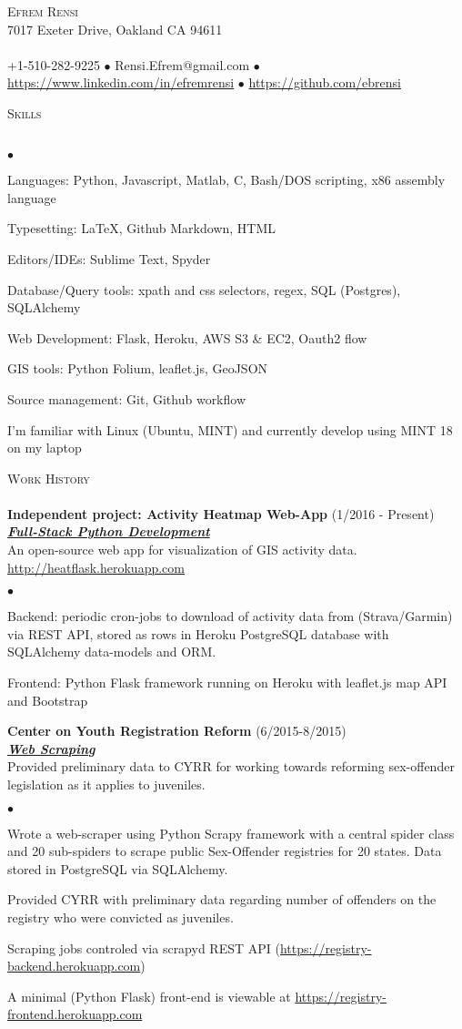 \documentclass{article}
\newcommand{\lineunder}{\vspace*{-8pt} \\ \hspace*{-18pt} \hrulefill \\}
\newcommand{\header}[1]{{\hspace*{-15pt}\vspace*{6pt} \textsc{#1}} \vspace*{-6pt} \lineunder}
\newcommand{\employer}[3]{{ \textbf{#1} (#2)\\ \underline{\textbf{\emph{#3}}}\\  }}
\newcommand{\contact}[3]{
\vspace*{-8pt}
\begin{center}
{\LARGE \scshape {#1}}\\
#2 \lineunder
#3
\end{center}
\vspace*{-8pt}
}
\newenvironment{achievements}{\begin{list}{$\bullet$}{\topsep 0pt \itemsep -2pt}}{\vspace*{4pt}\end{list}}
\begin{document}
\small
\smallskip
\vspace*{-44pt}

\contact{Efrem Rensi}
{7017 Exeter Drive, Oakland CA 94611}
{+1-510-282-9225 $\bullet$ Rensi.Efrem@gmail.com  $\bullet$ \url{https://www.linkedin.com/in/efremrensi}
$\bullet$ \url{https://github.com/ebrensi}
}
\smallskip

\header{Skills}
\begin{achievements}
\item Languages: Python, Javascript, Matlab, C, Bash/DOS scripting, x86 assembly language
\item Typesetting:  LaTeX, Github Markdown, HTML
\item Editors/IDEs: Sublime Text, Spyder
\item Database/Query tools: xpath and css selectors, regex, SQL (Postgres), SQLAlchemy
\item Web Development: Flask, Heroku,  AWS S3 \& EC2, Oauth2 flow
\item GIS tools:  Python Folium, leaflet.js, GeoJSON
\item Source management: Git, Github workflow 
\item I'm familiar with Linux (Ubuntu, MINT) and currently develop using MINT 18 on my laptop 
\end{achievements}
\medskip

\header{Work History}
\employer{Independent project: Activity Heatmap Web-App}{1/2016 - Present}{Full-Stack Python Development}
 An open-source web app for visualization of GIS activity data. \url{http://heatflask.herokuapp.com}
\begin{achievements}
\item Backend: periodic cron-jobs to download of activity data from (Strava/Garmin) via REST API, stored as rows in  Heroku PostgreSQL database with SQLAlchemy data-models and ORM.
\item Frontend: Python Flask framework running on Heroku with leaflet.js map API and Bootstrap
\end{achievements}


\employer{Center on Youth Registration Reform}{6/2015-8/2015}{Web Scraping}
 Provided preliminary data to CYRR for working towards reforming sex-offender legislation as it applies to juveniles.
\begin{achievements}
\item Wrote a web-scraper using Python Scrapy framework with a central spider class and 20 sub-spiders to scrape public Sex-Offender registries for 20 states.  Data stored in PostgreSQL via SQLAlchemy.
\item Provided  CYRR with preliminary data regarding number of offenders on the registry who were convicted as juveniles.
\item Scraping jobs controled via scrapyd REST API (\url{https://registry-backend.herokuapp.com}) 
\item A minimal (Python Flask) front-end is viewable at \url{https://registry-frontend.herokuapp.com}
\end{achievements}
\end{document}
